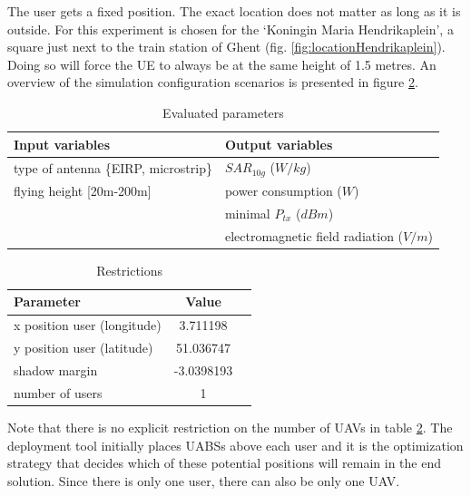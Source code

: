 The user gets a fixed position. The exact location does not matter as long as it is outside. For this experiment is chosen for the 
`Koningin Maria Hendrikaplein', a square just next to the train station of Ghent (fig. \ref{fig:locationHendrikaplein}).  Doing so will force the \gls{UE} 
to always be at the same height of 1.5 metres. 
An overview of the simulation configuration scenarios is presented in figure \ref{table:S1:restrictions}.
\newline
\begin{table}[!htb]
\centering
            \begin{tabular}{|l|l|}
            \hline
            \textbf{Input variables  }                    & \textbf{Output variables}          \\   \hline 
            type of antenna \{EIRP, microstrip\}            & $SAR_{10g}$  ($W/kg$)            \\ 
            flying height [20m-200m]                        & power consumption  ($W$)           \\ 
                                                          &  minimal $P_{tx}$ ($dBm$)\\ 
                                                          & electromagnetic field radiation ($V/m$)\\
            \hline
            \end{tabular} 
            \caption{Evaluated parameters}
          \label{table:s1:evalpara}
\end{table}
\begin{table}[!htb]
\centering
        \begin{tabular}{|l|c|l|}
        \hline
        \textbf{Parameter}              & \textbf{Value}          \\   \hline 
        x position user (longitude)              & 3.711198       \\    
        y position user (latitude)               & 51.036747          \\ 
        shadow margin             & -3.0398193 \\
        number of users                & 1 \\
        \hline
        \end{tabular}
        \caption{Restrictions}
        \label{table:S1:restrictions}
\end{table}


Note that there is no explicit restriction on the number of \gls{UAV}s in table \ref{table:S1:restrictions}. The deployment tool initially places 
\gls{UABS}s above each user and it is the optimization strategy that decides which of these potential positions will remain in the end solution.
Since there is only one user, there can also be only one \gls{UAV}.

